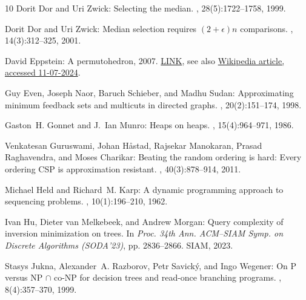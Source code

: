 \begin{thebibliography}{10}
{\sc Dorit Dor and Uri Zwick}: Selecting the median.
, 28(5):1722--1758, 1999.
\newblock [\epfmtdoi{10.1137/S0097539795288611}]

{\sc Dorit Dor and Uri Zwick}: Median selection requires $(2+\epsilon)n$
  comparisons.
, 14(3):312--325, 2001.
\newblock [\epfmtdoi{10.1137/S0895480199353895}]

{\sc David Eppstein}: A permutohedron, 2007.
\newblock \href{https://en.m.wikipedia.org/wiki/File:Permutohedron.svg}{LINK},
  see also \href{https://en.wikipedia.org/wiki/Permutohedron}{Wikipedia
  article, accessed 11-07-2024}.

{\sc Guy Even, Joseph Naor, Baruch Schieber, and Madhu Sudan}: Approximating
  minimum feedback sets and multicuts in directed graphs.
, 20(2):151--174, 1998.
\newblock [\epfmtdoi{10.1007/pl00009191}]

{\sc Gaston~H. Gonnet and J.~Ian Munro}: Heaps on heaps.
, 15(4):964--971, 1986.
\newblock [\epfmtdoi{10.1137/0215068}]

{\sc Venkatesan Guruswami, Johan H{\aa}stad, Rajsekar Manokaran, Prasad
  Raghavendra, and Moses Charikar}: Beating the random ordering is hard:
  {E}very ordering {CSP} is approximation resistant.
, 40(3):878--914, 2011.
\newblock [\epfmtdoi{10.1137/090756144}]

{\sc Michael Held and Richard~M. Karp}: A dynamic programming approach to
  sequencing problems.
, 10(1):196--210, 1962.
\newblock [\epfmtdoi{10.1137/0110015}]

{\sc Ivan Hu, Dieter van Melkebeek, and Andrew Morgan}: Query complexity of
  inversion minimization on trees.
\newblock In {\em Proc. 34th Ann. ACM--SIAM Symp. on Discrete Algorithms
  (SODA'23)}, pp. 2836--2866. SIAM, 2023.
\newblock [\epfmtdoi{10.1137/1.9781611977554.ch107}]

{\sc Stasys Jukna, Alexander~A. Razborov, Petr Savick{\'{y}}, and Ingo
  Wegener}: On {P} versus {NP} $\cap$ co-{NP} for decision trees and read-once
  branching programs.
, 8(4):357--370, 1999.
\newblock [\epfmtdoi{10.1007/s000370050005}]


\end{thebibliography}

